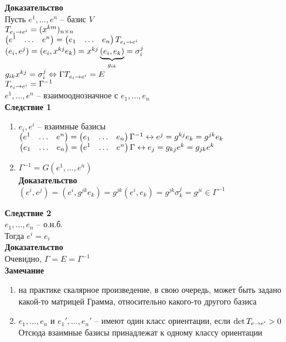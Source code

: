 \documentclass[12pt]{article}
\begin{document}
\textbf{Доказательство}\\
Пусть $e^1, \ldots, e^n$ -- базис $V$\\
$T_{e_i \rto e^i} = (x^{km})_{n\times n}$\\
$\begin{pmatrix}e^1 & \ldots & e^n\end{pmatrix} = \begin{pmatrix}e_1 & \ldots & e_n\end{pmatrix} T_{e_i\rto e^i}$\\
$(e_i, e^j) = (e_i, x^{kj} e_k) = x^{kj} \ub{g_{ik}}{(e_i, e_k)} = \sigma_i^j$\\
$g_{ik}x^{kj} = \sigma^j_i \LRto \Gamma T_{e_i \rto e^i} = E$\\
$T_{e_i \rto e^i} = \Gamma^{-1}$\\
$e^1,\ldots, e^n$ -- взаимооднозначное с $e_1,\ldots, e_n$\\
\textbf{Следствие 1}
\begin{enumerate}
    \item $e_i, e^i$ -- взаимные базисы\\
    $\begin{pmatrix}
        e^1 & \ldots & e^n
    \end{pmatrix} = \begin{pmatrix}
        e_1 & \ldots & e_n
    \end{pmatrix}\Gamma^{-1} \lrto e^j = g^{kj}e_k = g^{jk}e_k$\\
    $\begin{pmatrix}
        e_1 & \ldots & e_n
    \end{pmatrix} = \begin{pmatrix}
        e^1 & \ldots & e^n
    \end{pmatrix}\Gamma \lrto e_j = g_{kj}e^k = g_{jk}e^k$
    \item $\Gamma^{-1} = G(e^1, \ldots, e^n)$\\
    \textbf{Доказательство}\\
    $(e^i, e^j) = (e^i, g^{jk}e_k) = g^{jk}(e^i,e_k)=g^{jk}\sigma^j_k = g^{ji} \in \Gamma^{-1}$
\end{enumerate}
\textbf{Следствие 2}\\
$e_1, \ldots, e_n$ -- о.н.б.\\
Тогда $e^i = e_i$\\
\textbf{Доказательство}\\
Очевидно, $\Gamma = E = \Gamma^{-1}$\\
\textbf{Замечание}
\begin{enumerate}
    \item на практике скалярное произведение, в свою очередь, может быть задано какой-то матрицей Грамма, относительно какого-то другого базиса
    \item $e_1, \ldots, e_n$ и $e_1', \ldots, e_n'$ -- имеют один класс ориентации, если $\det T_{e\rto e'} > 0$\\
    Отсюда взаимные базисы принадлежат к одному классу ориентации
\end{enumerate}
\end{document}
